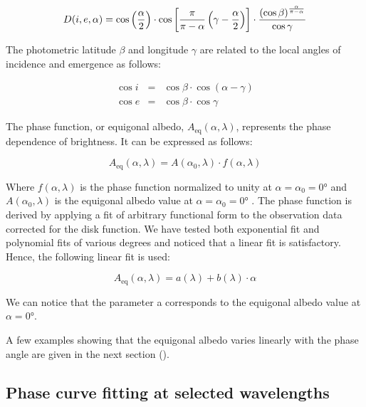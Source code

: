 \documentclass{arxiv-icarus}
\begin{document}
\begin{equation}\small\label{eq:eq_4}
    D(i, e, \alpha) = \cos\left( \frac{\alpha}{2} \right)
    \cdot
    \cos\left[
        \frac{\pi}{\pi - \alpha} \left( \gamma - \frac{\alpha}{2} \right)
    \right]
    \cdot
    \frac{\left( \cos\beta \right)^{ \frac{\alpha}{\pi - \alpha} }}{\cos\gamma}
\end{equation}

The photometric latitude $\beta$ and longitude $\gamma$ are related to the local angles of incidence and emergence as follows:

\begin{eqnarray}\label{eq:eq_5}
    \cos i &=& \cos\beta \cdot \cos(\alpha - \gamma) \\
    \cos e &=& \cos\beta \cdot \cos\gamma
\end{eqnarray}

The phase function, or equigonal albedo, $A_\textrm{eq} (\alpha, \lambda)$, represents the phase dependence of brightness. It can be expressed as follows:

\begin{equation}\label{eq:eq_6}
    A_\textrm{eq} (\alpha, \lambda) = A \left( \alpha_0, \lambda \right) \cdot f (\alpha, \lambda)
\end{equation}

Where $f (\alpha, \lambda)$ is the phase function normalized to unity at $\alpha = \alpha_0 = \ang{0}$ and $A \left( \alpha_0, \lambda \right)$ is the equigonal albedo value at $\alpha = \alpha_0 = \ang{0}$ \citep{Shkuratov2011}. The phase function is derived by applying a fit of arbitrary functional form to the observation data corrected for the disk function. We have tested both exponential fit and polynomial fits of various degrees and noticed that a linear fit is satisfactory. Hence, the following linear fit is used:

\begin{equation}\label{eq:eq_8}
    A_\textrm{eq} (\alpha, \lambda) = a (\lambda) + b (\lambda) \cdot \alpha
\end{equation}

We can notice that the parameter a corresponds to the equigonal albedo value at $\alpha = \ang{0}$.

A few examples showing that the equigonal albedo varies linearly with the phase angle are given in the next section ().

\subsection{Phase curve fitting at selected wavelengths}\label{sec:sec_3.2}
\end{document}
